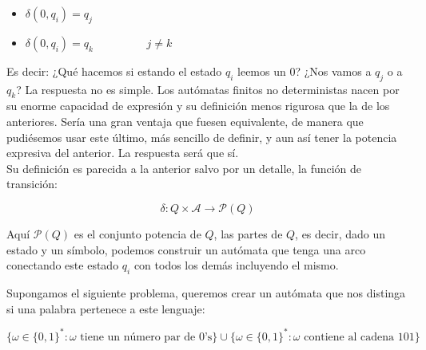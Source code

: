 \begin{multicols}{2}
	\begin{itemize}
		\item $\delta(0,q_i)=q_j$
		\item $\delta(0,q_i)=q_k \hspace{2cm} j\neq k$
	\end{itemize}
\end{multicols}


Es decir: ¿Qué hacemos si estando el estado $q_i$ leemos un $0$? ¿Nos vamos a $q_j$ o a $q_k$? La respuesta no es simple. Los autómatas finitos no deterministas nacen por su enorme capacidad de expresión y su definición menos rigurosa que la de los anteriores. Sería una gran ventaja que fuesen equivalente, de manera que pudiésemos usar este último, más sencillo de definir, y aun así tener la potencia expresiva del anterior. La respuesta será que sí. \\


Su definición es parecida a la anterior salvo por un detalle, la función de transición:

$$\delta :Q\times \mathcal{A} \rightarrow \mathcal{P}(Q)$$

Aquí $\mathcal{P}(Q)$ es el conjunto potencia de $Q$, las partes de $Q$, es decir, dado un estado y un símbolo, podemos construir un autómata que tenga una arco conectando este estado $q_i$ con todos los demás incluyendo el mismo.


Supongamos el siguiente problema, queremos crear un autómata que nos distinga  si una palabra pertenece a este lenguaje:

$$\{ \omega \in \{0,1\}^* : \omega \text{ tiene un número par de 0's} \} \cup \{\omega  \in \{0,1\}^*: \omega \text{ contiene al cadena }  101 \}$$

